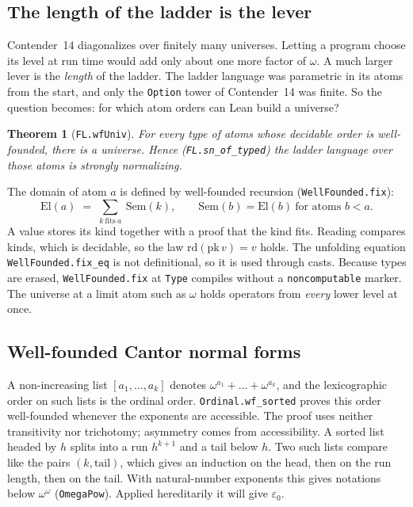\documentclass[11pt]{article}
\newtheorem{theorem}{Theorem}
\theoremstyle{definition}
\theoremstyle{remark}
\newcommand{\lean}[1]{\texttt{#1}}
\begin{document}
\subsection{The length of the ladder is the lever}
Contender~14 diagonalizes over finitely many universes. Letting a program
choose its level at run time would add only about one more factor of $\omega$.
A much larger lever is the \emph{length} of the ladder. The ladder language
was parametric in its atoms from the start, and only the \lean{Option} tower of
Contender~14 was finite. So the question becomes: for which atom orders can
Lean build a universe?

\begin{theorem}[\lean{FL.wfUniv}]
For every type of atoms whose decidable order is well-founded, there is a
universe. Hence (\lean{FL.sn\_of\_typed}) the ladder language over those atoms is
strongly normalizing.
\end{theorem}
The domain of atom $a$ is defined by well-founded recursion
(\lean{WellFounded.fix}):
\[
\mathrm{El}(a) \;=\; \textstyle\sum_{k\ \text{fits}\ a}\ \mathrm{Sem}(k),
\qquad \mathrm{Sem}(b) = \mathrm{El}(b)\ \text{for atoms } b<a .
\]
A value stores its kind together with a proof that the kind fits. Reading
compares kinds, which is decidable, so the law $\mathrm{rd}(\mathrm{pk}\,v)=v$
holds. The unfolding equation \lean{WellFounded.fix\_eq} is not
definitional, so it is used through casts. Because types are erased,
\lean{WellFounded.fix} at \lean{Type} compiles without a
\lean{noncomputable} marker. The universe at a limit atom such as $\omega$
holds operators from \emph{every} lower level at once.

\subsection{Well-founded Cantor normal forms}
A non-increasing list $[a_1,\dots,a_k]$ denotes
$\omega^{a_1}+\dots+\omega^{a_k}$, and the lexicographic order on such lists is
the ordinal order. \lean{Ordinal.wf\_sorted} proves this order well-founded
whenever the exponents are accessible. The proof uses neither transitivity nor
trichotomy; asymmetry comes from accessibility. A sorted list headed by $h$
splits into a run $h^{k+1}$ and a tail below $h$. Two such lists compare like
the pairs $(k,\text{tail})$, which gives an induction on the head, then on the
run length, then on the tail. With natural-number exponents this gives
notations below $\omega^\omega$ (\lean{OmegaPow}). Applied hereditarily it will
give $\varepsilon_0$.
\end{document}
